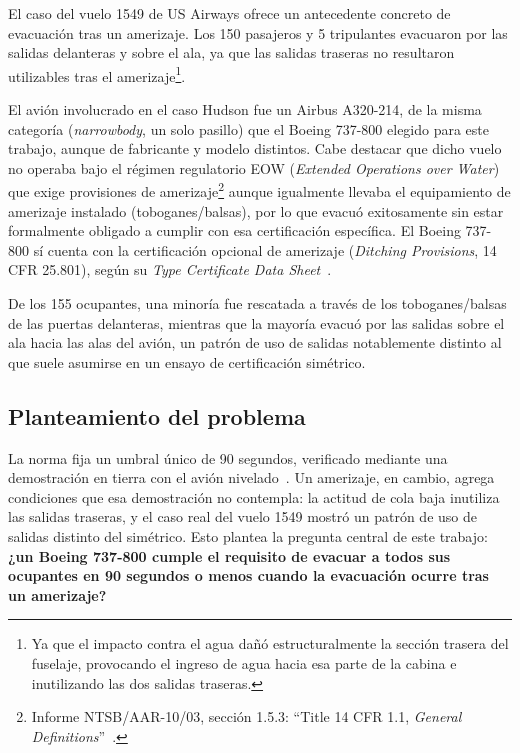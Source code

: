 \documentclass[a4paper, 11pt]{article}
\begin{document}
El caso del vuelo 1549 de US Airways ofrece un antecedente concreto de evacuaci\'on
tras un amerizaje. Los 150 pasajeros y 5
tripulantes evacuaron por las salidas delanteras y sobre el ala, ya que las salidas
traseras no resultaron utilizables tras el amerizaje\footnote{Ya que el impacto
contra el agua da\~n\'o estructuralmente la secci\'on trasera del fuselaje,
provocando el ingreso de agua hacia esa parte de la cabina e inutilizando las dos
salidas traseras.}.

El avi\'on involucrado en el caso Hudson fue un Airbus A320-214, de la misma
categor\'ia (\textit{narrowbody}, un solo pasillo) que el Boeing 737-800 elegido
para este trabajo, aunque de fabricante y modelo distintos. Cabe destacar que dicho
vuelo no operaba bajo el r\'egimen regulatorio EOW (\textit{Extended Operations over
Water}) que exige provisiones de amerizaje\footnote{Informe NTSB/AAR-10/03,
secci\'on 1.5.3: ``Title 14 CFR 1.1, \textit{General Definitions}''~\cite{ntsb2010}.}
aunque igualmente llevaba el equipamiento de amerizaje instalado
(toboganes/balsas), por lo que evacu\'o exitosamente sin estar formalmente obligado
a cumplir con esa certificaci\'on espec\'ifica. El Boeing 737-800 s\'i cuenta con la
certificaci\'on opcional de amerizaje (\textit{Ditching Provisions}, 14 CFR 25.801),
seg\'un su \textit{Type Certificate Data Sheet}~\cite{easa_tcds737}.

De los 155 ocupantes, una minor\'ia fue rescatada a trav\'es de los
toboganes/balsas de las puertas delanteras, mientras que la mayor\'ia evacu\'o por
las salidas sobre el ala hacia las alas del avi\'on, un patr\'on de uso de salidas
notablemente distinto al que suele asumirse en un ensayo de certificaci\'on
sim\'etrico.

\subsection{Planteamiento del problema}

La norma fija un umbral \'unico de 90 segundos, verificado mediante una
demostraci\'on en tierra con el avi\'on nivelado~\cite{cfrAppJ}. Un amerizaje, en
cambio, agrega condiciones que esa demostraci\'on no contempla: la actitud de cola
baja inutiliza las salidas traseras, y el caso real del vuelo 1549 mostr\'o un
patr\'on de uso de salidas distinto del sim\'etrico. Esto plantea la pregunta central
de este trabajo: \textbf{¿un Boeing 737-800 cumple el requisito de evacuar a todos sus
ocupantes en 90 segundos o menos cuando la evacuaci\'on ocurre tras un amerizaje?}
\end{document}
